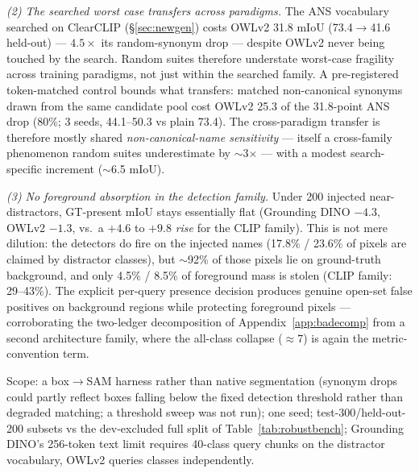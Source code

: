\documentclass[11pt]{article}
\newcommand{\miou}{mIoU}
\begin{document}
\emph{(2) The searched worst case transfers across paradigms.} The ANS
vocabulary searched on ClearCLIP (\S\ref{sec:newgen}) costs OWLv2 31.8 \miou{}
(73.4$\to$41.6 held-out) --- $4.5\times$ its random-synonym drop --- despite
OWLv2 never being touched by the search. Random suites therefore understate
worst-case fragility across training paradigms, not just within the searched
family. A pre-registered token-matched control bounds what transfers:
matched non-canonical synonyms drawn from the same candidate pool cost OWLv2 25.3 of
the 31.8-point ANS drop (80\%; 3 seeds, 44.1--50.3 vs plain 73.4). The
cross-paradigm transfer is therefore mostly shared \emph{non-canonical-name
sensitivity} --- itself a cross-family phenomenon random suites
underestimate by $\sim$3$\times$ --- with a modest search-specific increment
($\sim$6.5 \miou{}).

\emph{(3) No foreground absorption in the detection family.} Under 200
injected near-distractors, GT-present \miou{} stays essentially flat
(Grounding DINO $-4.3$, OWLv2 $-1.3$, vs.\ a $+4.6$ to $+9.8$ \emph{rise} for
the CLIP family). This is not mere dilution: the detectors do fire on the
injected names (17.8\% / 23.6\% of pixels are claimed by distractor
classes), but $\sim$92\% of those pixels lie on ground-truth background, and
only 4.5\% / 8.5\% of foreground mass is stolen (CLIP family: 29--43\%).
The explicit per-query presence decision produces genuine open-set false
positives on background regions while protecting foreground pixels ---
corroborating the two-ledger decomposition of Appendix~\ref{app:badecomp}
from a second architecture family, where the all-class collapse
($\approx$7) is again the metric-convention term.

Scope: a box$\to$SAM harness rather than native segmentation (synonym drops
could partly reflect boxes falling below the fixed detection threshold
rather than degraded matching; a threshold sweep was not run); one seed;
test-300/held-out-200 subsets vs the dev-excluded full split of
Table~\ref{tab:robustbench}; Grounding DINO's 256-token text limit requires
40-class query chunks on the distractor vocabulary, OWLv2 queries classes
independently.
\end{document}
